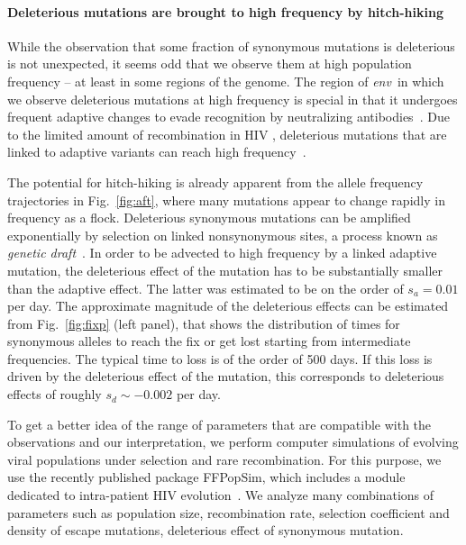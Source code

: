\documentclass[rmp, twocolumn]{revtex4}
\newcommand{\env}{\textit{env}}
\newcommand{\FIG}[1]{Fig.~\ref{fig:#1}}
\begin{document}
\paragraph{Deleterious mutations are brought to high frequency by hitch-hiking}
While the observation that some fraction of synonymous mutations is deleterious
is not unexpected, it seems odd that we observe them at high population
frequency -- at least in some regions of the genome. The region of \env~in which
we observe deleterious mutations at high frequency is special in that it
undergoes frequent adaptive changes to evade recognition by neutralizing
antibodies~\cite{williamson_adaptation_2003}. Due to the limited amount of
recombination in HIV \cite{neher_recombination_2010,batorsky_estimate_2011},
deleterious mutations that are linked to adaptive variants can reach high
frequency~\citep{smith_hitch-hiking_1974}.

The potential for hitch-hiking is already apparent from the allele frequency
trajectories in \FIG{aft}, where many mutations appear to change rapidly in
frequency as a flock. Deleterious synonymous mutations can be amplified
exponentially by selection on linked nonsynonymous sites, a process known as
{\it genetic draft}~\citep{gillespie_genetic_2000, neher_genetic_2011}. In order
to be advected to high frequency by a linked adaptive mutation, the deleterious
effect of the mutation has to be substantially smaller than the adaptive effect.
The latter was estimated to be on the order of $s_a = 0.01$ per day. The
approximate magnitude of the deleterious effects can be estimated from
\FIG{fixp} (left panel), that shows the distribution of times for synonymous
alleles to reach the fix or get lost starting from intermediate frequencies. The
typical time to loss is of the order of 500 days. If this loss is driven by the
deleterious effect of the mutation, this corresponds to deleterious effects of
roughly $s_d \sim - 0.002$ per day.

To get a better idea of the range of parameters that are compatible with the
observations and our interpretation, we  perform computer simulations of
evolving viral populations under selection and rare recombination. For this
purpose, we use the recently published package FFPopSim, which includes a module
dedicated to intra-patient HIV evolution~\citep{zanini_ffpopsim:_2012}. We
analyze many combinations of parameters such as population size, recombination
rate, selection coefficient and density of escape mutations, deleterious effect
of synonymous mutation.
\end{document}
